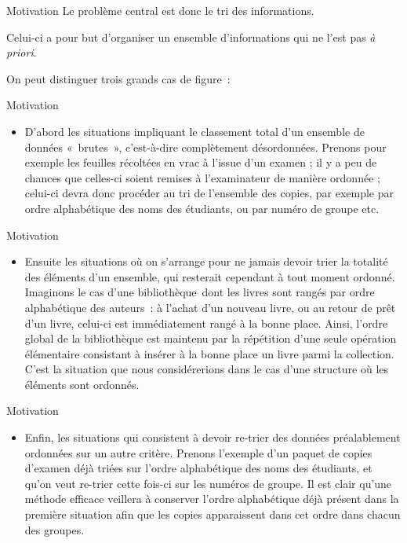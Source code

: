 \begin{frame}{Motivation}
	Le problème central est donc le tri des informations. 
	
	\bigskip
	
	Celui-ci a pour
	but d’organiser un ensemble d’informations qui ne l’est pas \textit{à
	priori}. 
	
	\bigskip
	
	On peut distinguer trois grands cas de figure~:
\end{frame}

\begin{frame}{Motivation}
	\begin{itemize}
		\item 
			D’abord les situations impliquant le classement total d’un ensemble de
			données «~brutes~», c’est-à-dire complètement désordonnées. Prenons
			pour exemple les feuilles récoltées en vrac à l’issue d’un examen ; il
			y a peu de chances que celles-ci soient remises à l’examinateur de
			manière ordonnée ; celui-ci devra donc procéder au tri de l’ensemble
			des copies, par exemple par ordre alphabétique des noms des étudiants,
			ou par numéro de groupe etc.
	\end{itemize}
\end{frame}
	
\begin{frame}{Motivation}
	\begin{itemize}
		\item 
			Ensuite les situations où on s’arrange pour ne jamais devoir trier la
			totalité des éléments d’un ensemble, qui resterait cependant à tout
			moment ordonné. Imaginons le cas d’une bibliothèque~dont les livres
			sont rangés par ordre alphabétique des auteurs~: à l’achat d’un nouveau
			livre, ou au retour de prêt d’un livre, celui-ci est immédiatement
			rangé à la bonne place. Ainsi, l’ordre global de la bibliothèque est
			maintenu par la répétition d’une seule opération élémentaire consistant
			à insérer à la bonne place un livre parmi la collection. C’est la
			situation que nous considérerions dans le cas d'une structure
			où les éléments sont ordonnés.
	\end{itemize}
\end{frame}
	
\begin{frame}{Motivation}
	\begin{itemize}
		\item 
			Enfin, les situations qui consistent à devoir re-trier des données
			préalablement ordonnées sur un autre critère. Prenons l’exemple d’un
			paquet de copies d’examen déjà triées sur l’ordre alphabétique des noms
			des étudiants, et qu’on veut re-trier cette fois-ci sur les numéros de
			groupe. Il est clair qu’une méthode efficace veillera à conserver
			l’ordre alphabétique déjà présent dans la première situation afin que
			les copies apparaissent dans cet ordre dans chacun des groupes.
	\end{itemize}
\end{frame}
	
